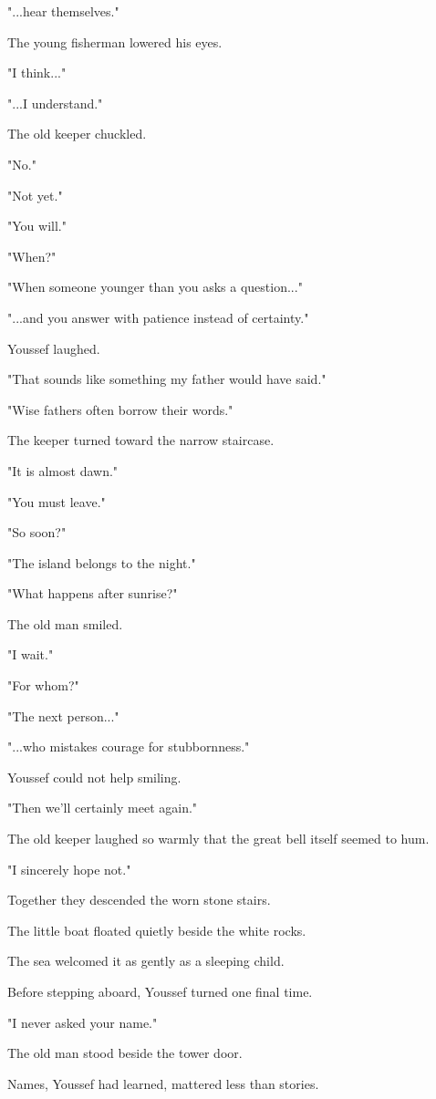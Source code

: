 \documentclass[12pt,openany]{book}
\begin{document}
"...hear themselves."

The young fisherman lowered his eyes.

"I think..."

"...I understand."

The old keeper chuckled.

"No."

"Not yet."

"You will."

"When?"

"When someone younger than you asks a question..."

"...and you answer with patience instead of certainty."

Youssef laughed.

"That sounds like something my father would have said."

"Wise fathers often borrow their words."

The keeper turned toward the narrow staircase.

"It is almost dawn."

"You must leave."

"So soon?"

"The island belongs to the night."

"What happens after sunrise?"

The old man smiled.

"I wait."

"For whom?"

"The next person..."

"...who mistakes courage for stubbornness."

Youssef could not help smiling.

"Then we'll certainly meet again."

The old keeper laughed so warmly that the great bell itself seemed to hum.

"I sincerely hope not."

Together they descended the worn stone stairs.

The little boat floated quietly beside the white rocks.

The sea welcomed it as gently as a sleeping child.

Before stepping aboard, Youssef turned one final time.

"I never asked your name."

The old man stood beside the tower door.

Names, Youssef had learned, mattered less than stories.
\end{document}
